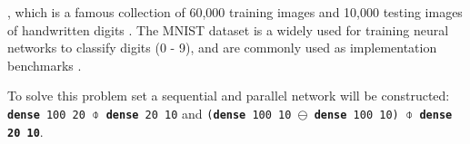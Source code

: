 \documentclass[report.tex]{subfiles}
\begin{document}
, which is a famous collection of 60,000 training images
and 10,000 testing images of handwritten digits \cite{LeCun1998}.
The MNIST dataset is a widely used for training neural networks to classify digits (0 - 9),
and are commonly used as implementation benchmarks \cite{Schmidhuber2014, Schmitt2017}.

To solve this problem set a sequential and parallel network will be constructed:
\texttt{\textbf{dense} 100 20 $\obar$ \textbf{dense} 20 10} and
\texttt{(\textbf{dense} 100 10 $\ominus$ \textbf{dense} 100 10) $\obar$ \textbf{dense 20 10}}.

\begin{comment}
\gls{ANN}s have been studied extensively and have surpassed human performance
in a number of tasks (most recently the 
advanced real-time strategy game Starcraft II \cite{DeepMind2019})
\autocite{Schmidhuber2014, Nilsson2009, Russel2007}.
\gls{SNN}s have been studied extensively in smaller applications such as single-neuron studies 
\autocite{Dayan2001, Indiveri2015}, but studies in larger scale are still rare,
although \textcite{Hunsberger2015, Jordan2018, Lin2018, Pfeil2013,
Rueckauer2017, Schmitt2017} have constructed classifiers that reach
near-\gls{ANN} precision, but with a 


\gls{SNN}s have been studied extensively in smaller applications such as single-neuron studies, but less so in larger setups such as learning and classification tasks \autocite{dayan2001, Indiveri2015}.
Conversely \gls{ANN}s have been extensively studied in more complex tasks where architectures such as \gls{DNN} have excelled \autocite{schmidhuber2014, Nilsson2009, russel2007}.

\subsection{Neuromorphic backend} \label{sec:neuromorphic}



\end{comment}
\end{document}

